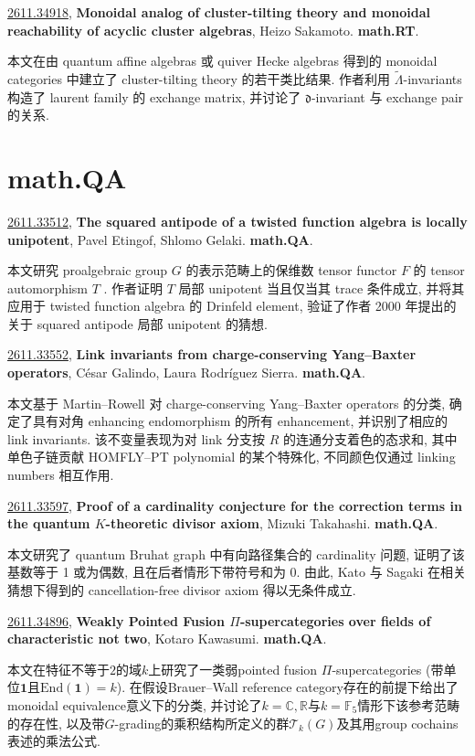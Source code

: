 \documentclass[9pt, a4paper]{article}
\theoremstyle{plain}
\theoremstyle{definition}
\theoremstyle{remark}
\newcommand{\arxivwithtarget}[3]{\hypertarget{#1}{}\href{https://arxiv.org/abs/#1}{#1}, \textbf{\textcolor{arxivblue}{#2}}, #3. }
\begin{document}
\arxivwithtarget{2611.34918}{Monoidal analog of cluster-tilting theory and monoidal reachability of acyclic cluster algebras}{Heizo Sakamoto}\textbf{math.RT}.

本文在由 quantum affine algebras 或 quiver Hecke algebras 得到的 monoidal categories 中建立了 cluster-tilting theory 的若干类比结果. 作者利用 $\widetilde{\Lambda}$-invariants 构造了 laurent family 的 exchange matrix, 并讨论了 $\mathfrak{d}$-invariant 与 exchange pair 的关系.


\section{math.QA}
\arxivwithtarget{2611.33512}{The squared antipode of a twisted function algebra is locally unipotent}{Pavel Etingof, Shlomo Gelaki}\textbf{math.QA}.

本文研究 proalgebraic group $G$ 的表示范畴上的保维数 tensor functor $F$ 的 tensor automorphism $T$ . 作者证明 $T$ 局部 unipotent 当且仅当其 trace 条件成立, 并将其应用于 twisted function algebra 的 Drinfeld element, 验证了作者 2000 年提出的关于 squared antipode 局部 unipotent 的猜想.


\arxivwithtarget{2611.33552}{Link invariants from charge-conserving Yang--Baxter operators}{César Galindo, Laura Rodríguez Sierra}\textbf{math.QA}.

本文基于 Martin--Rowell 对 charge-conserving Yang--Baxter operators 的分类, 确定了具有对角 enhancing endomorphism 的所有 enhancement, 并识别了相应的 link invariants. 该不变量表现为对 link 分支按 $R$ 的连通分支着色的态求和, 其中单色子链贡献 HOMFLY--PT polynomial 的某个特殊化, 不同颜色仅通过 linking numbers 相互作用.


\arxivwithtarget{2611.33597}{Proof of a cardinality conjecture for the correction terms in the quantum $K$-theoretic divisor axiom}{Mizuki Takahashi}\textbf{math.QA}.

本文研究了 quantum Bruhat graph 中有向路径集合的 cardinality 问题, 证明了该基数等于 1 或为偶数, 且在后者情形下带符号和为 0. 由此, Kato 与 Sagaki 在相关猜想下得到的 cancellation-free divisor axiom 得以无条件成立.


\arxivwithtarget{2611.34896}{Weakly Pointed Fusion $Π$-supercategories over fields of characteristic not two}{Kotaro Kawasumi}\textbf{math.QA}.

本文在特征不等于$2$的域$k$上研究了一类弱pointed fusion $\Pi$-supercategories (带单位$\mathbf 1$且$\mathrm{End}(\mathbf 1)=k$). 在假设Brauer--Wall reference category存在的前提下给出了monoidal equivalence意义下的分类, 并讨论了$k=\mathbb C,\mathbb R$与$k=\mathbb F_5$情形下该参考范畴的存在性, 以及带$G$-grading的乘积结构所定义的群$\mathcal T_k(G)$及其用group cochains表述的乘法公式.
\end{document}
